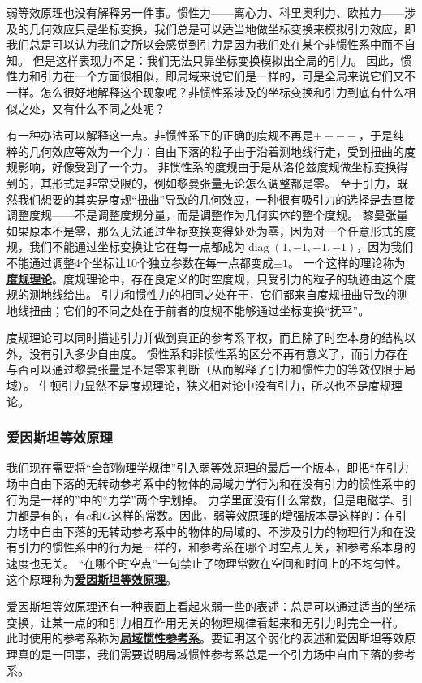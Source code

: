 \documentclass[hyperref, UTF8, a4paper]{ctexart}
\DeclareMathOperator{\diag}{diag}
\newcommand*{\concept}[1]{\underline{\textbf{#1}}}
\begin{document}
弱等效原理也没有解释另一件事。惯性力——离心力、科里奥利力、欧拉力——涉及的几何效应只是坐标变换，我们总是可以适当地做坐标变换来模拟引力效应，即我们总是可以认为我们之所以会感觉到引力是因为我们处在某个非惯性系中而不自知。
但是这样表现力不足：我们无法只靠坐标变换模拟出全局的引力。
因此，惯性力和引力在一个方面很相似，即局域来说它们是一样的，可是全局来说它们又不一样。怎么很好地解释这个现象呢？非惯性系涉及的坐标变换和引力到底有什么相似之处，又有什么不同之处呢？

有一种办法可以解释这一点。非惯性系下的正确的度规不再是$+---$，于是纯粹的几何效应等效为一个力：自由下落的粒子由于沿着测地线行走，受到扭曲的度规影响，好像受到了一个力。
非惯性系的度规由于是从洛伦兹度规做坐标变换得到的，其形式是非常受限的，例如黎曼张量无论怎么调整都是零。
至于引力，既然我们想要的其实是度规“扭曲”导致的几何效应，一种很有吸引力的选择是去直接调整度规——不是调整度规分量，而是调整作为几何实体的整个度规。
黎曼张量如果原本不是零，那么无法通过坐标变换变得处处为零，因为对一个任意形式的度规，我们不能通过坐标变换让它在每一点都成为$\diag(1, -1, -1, -1)$，因为我们不能通过调整4个坐标让10个独立参数在每一点都变成$\pm 1$。
一个这样的理论称为\concept{度规理论}。度规理论中，存在良定义的时空度规，只受引力的粒子的轨迹由这个度规的测地线给出。
引力和惯性力的相同之处在于，它们都来自度规扭曲导致的测地线扭曲；它们的不同之处在于前者的度规不能够通过坐标变换“抚平”。

度规理论可以同时描述引力并做到真正的参考系平权，而且除了时空本身的结构以外，没有引入多少自由度。
惯性系和非惯性系的区分不再有意义了，而引力存在与否可以通过黎曼张量是不是零来判断（从而解释了引力和惯性力的等效仅限于局域）。
牛顿引力显然不是度规理论，狭义相对论中没有引力，所以也不是度规理论。

\subsubsection{爱因斯坦等效原理}

我们现在需要将“全部物理学规律”引入弱等效原理的最后一个版本，即把“在引力场中自由下落的无转动参考系中的物体的局域力学行为和在没有引力的惯性系中的行为是一样的”中的“力学”两个字划掉。
力学里面没有什么常数，但是电磁学、引力都是有的，有$c$和$G$这样的常数。因此，弱等效原理的增强版本是这样的：在引力场中自由下落的无转动参考系中的物体的局域的、不涉及引力的物理行为和在没有引力的惯性系中的行为是一样的，和参考系在哪个时空点无关，和参考系本身的速度也无关。
“在哪个时空点”一句禁止了物理常数在空间和时间上的不均匀性。这个原理称为\concept{爱因斯坦等效原理}。

爱因斯坦等效原理还有一种表面上看起来弱一些的表述：总是可以通过适当的坐标变换，让某一点的和引力相互作用无关的物理规律看起来和无引力时完全一样。
此时使用的参考系称为\concept{局域惯性参考系}。要证明这个弱化的表述和爱因斯坦等效原理真的是一回事，我们需要说明局域惯性参考系总是一个引力场中自由下落的参考系。
\end{document}
